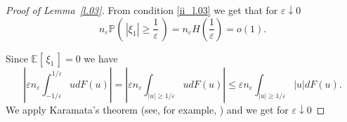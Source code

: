 \documentclass{article}
\theoremstyle{plain}
\theoremstyle{definition}
\theoremstyle{remark}
\newcommand{\p}[2][]{{\mathbb{P}}_{#1} \left( \, #2 \, \right) } %
\newcommand{\e}[2][]{{\mathbb{E}_{#1}\left[ \, #2 \,\right] }} %
\newcommand{\beq}{\begin{equation}}
\newcommand{\eeq}{\end{equation}}
\begin{document}
\begin{proof}[Proof of Lemma~\ref{l.03}]
From condition \ref{ii_l.03} we get that for $\varepsilon\downarrow 0$
\beq\label{23.10.2}
n_\varepsilon \p{|\xi_1|\geqslant \frac{1}{\varepsilon}}=n_\varepsilon H\left(\frac{1}{\varepsilon}\right)=o(1).
\eeq

Since $\e{\xi_1}=0$ we have
\beq\label{23.10.3}
\left|\varepsilon n_\varepsilon \int_{-1/\varepsilon}^{1/\varepsilon} u dF(u)\right|
=\left|\varepsilon n_\varepsilon \int_{|u|\geqslant 1/\varepsilon} u dF(u)\right|
\leq\varepsilon n_\varepsilon \int_{|u|\geqslant 1/\varepsilon} |u| dF(u).
\eeq
We apply Karamata's theorem (see, for example, \citet[theorem 6.1]{buldygin2018generalized}) and we get
for $\varepsilon\downarrow 0$


\end{proof}
\end{document}
